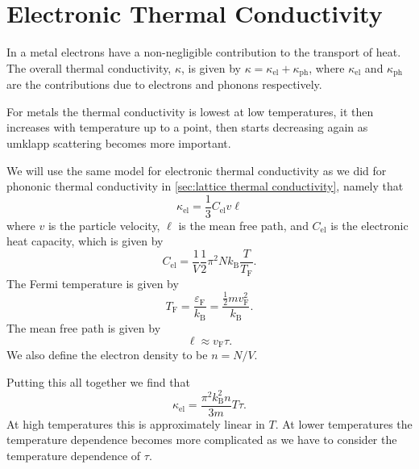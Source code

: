 \documentclass[fleqn]{NotesClass}
\newcommand*{\boltzmann}{k_{\mathrm{B}}}
\newcommand*{\fermi}{\mathrm{F}}
\begin{document}
    \section{Electronic Thermal Conductivity}
    In a metal electrons have a non-negligible contribution to the transport of heat.
    The overall thermal conductivity, \(\kappa\), is given by \(\kappa = \kappa_{\mathrm{el}} + \kappa_{\mathrm{ph}}\), where \(\kappa_{\mathrm{el}}\) and \(\kappa_{\mathrm{ph}}\) are the contributions due to electrons and phonons respectively.
    
    For metals the thermal conductivity is lowest at low temperatures, it then increases with temperature up to a point, then starts decreasing again as umklapp scattering becomes more important.
    
    We will use the same model for electronic thermal conductivity as we did for phononic thermal conductivity in \cref{sec:lattice thermal conductivity}, namely that
    \begin{equation}
        \kappa_{\mathrm{el}} = \frac{1}{3}C_{\mathrm{el}}v\ell
    \end{equation}
    where \(v\) is the particle velocity, \(\ell\) is the mean free path, and \(C_{\mathrm{el}}\) is the electronic heat capacity, which is given by
    \begin{equation}
        C_{\mathrm{el}} = \frac{1}{V} \frac{1}{2}\pi^2N\boltzmann \frac{T}{T_{\fermi}}.
    \end{equation}
    The Fermi temperature is given by
    \begin{equation}
        T_{\fermi} = \frac{\varepsilon_{\fermi}}{\boltzmann} = \frac{\frac{1}{2}mv_{\fermi}^2}{\boltzmann}.
    \end{equation}
    The mean free path is given by
    \begin{equation}
        \ell \approx v_\fermi \tau.
    \end{equation}
    We also define the electron density to be \(n = N/V\).
    
    Putting this all together we find that
    \begin{equation}
        \kappa_{\mathrm{el}} = \frac{\pi^2\boltzmann^2 n}{3m}T\tau.
    \end{equation}
    At high temperatures this is approximately linear in \(T\).
    At lower temperatures the temperature dependence becomes more complicated as we have to consider the temperature dependence of \(\tau\).
    
\end{document}

